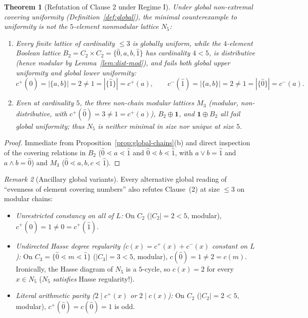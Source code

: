 \documentclass[11pt,a4paper]{article}
\newtheorem{theorem}{Theorem}[section]
\theoremstyle{definition}
\theoremstyle{remark}
\newtheorem{remark}[theorem]{Remark}
\newcommand{\cov}{\lessdot}
\begin{document}
\begin{theorem}[Refutation of Clause 2 under Regime I]\label{thm:regime-I}
Under global non-extremal covering uniformity (Definition~\ref{def:global}), the minimal counterexample to uniformity is \emph{not} the $5$-element nonmodular lattice $N_5$:
\begin{enumerate}
  \item[(1)] Every finite lattice of cardinality $\le 3$ is globally uniform, while the $4$-element Boolean lattice $B_2 = C_2 \times C_2 = \{\hat{0}, a, b, \hat{1}\}$ has cardinality $4 < 5$, is distributive (hence modular by Lemma~\ref{lem:dist-mod}), and fails \emph{both} global upper uniformity and global lower uniformity:
  \[
    c^+(\hat{0}) = |\{a, b\}| = 2 \neq 1 = |\{\hat{1}\}| = c^+(a), \qquad
    c^-(\hat{1}) = |\{a, b\}| = 2 \neq 1 = |\{\hat{0}\}| = c^-(a).
  \]
  \item[(2)] Even at cardinality $5$, the three non-chain modular lattices $M_3$ (modular, non-distributive, with $c^+(\hat{0}) = 3 \neq 1 = c^+(a)$), $B_2 \oplus \mathbf{1}$, and $\mathbf{1} \oplus B_2$ all fail global uniformity; thus $N_5$ is neither minimal in size nor unique at size $5$.
\end{enumerate}
\end{theorem}
\begin{proof}
Immediate from Proposition~\ref{prop:global-chains}(b) and direct inspection of the covering relations in $B_2$ ($\hat{0} \cov a \cov \hat{1}$ and $\hat{0} \cov b \cov \hat{1}$, with $a \vee b = \hat{1}$ and $a \wedge b = \hat{0}$) and $M_3$ ($\hat{0} \cov a, b, c \cov \hat{1}$).
\end{proof}

\begin{remark}[Ancillary global variants]\label{rem:ancillary}
Every alternative global reading of ``evenness of element covering numbers'' also refutes Clause~(2) at size $\le 3$ on modular chains:
\begin{itemize}
  \item \emph{Unrestricted constancy on all of $L$:} On $C_2$ ($|C_2| = 2 < 5$, modular), $c^+(\hat{0}) = 1 \neq 0 = c^+(\hat{1})$.
  \item \emph{Undirected Hasse degree regularity ($c(x) = c^+(x) + c^-(x)$ constant on $L$):} On $C_3 = \{\hat{0} \cov m \cov \hat{1}\}$ ($|C_3| = 3 < 5$, modular), $c(\hat{0}) = 1 \neq 2 = c(m)$. Ironically, the Hasse diagram of $N_5$ is a $5$-cycle, so $c(x) = 2$ for every $x \in N_5$ ($N_5$ \emph{satisfies} Hasse regularity!).
  \item \emph{Literal arithmetic parity ($2 \mid c^+(x)$ or $2 \mid c(x)$):} On $C_2$ ($|C_2| = 2 < 5$, modular), $c^+(\hat{0}) = c(\hat{0}) = 1$ is odd.
\end{itemize}
\end{remark}
\end{document}
